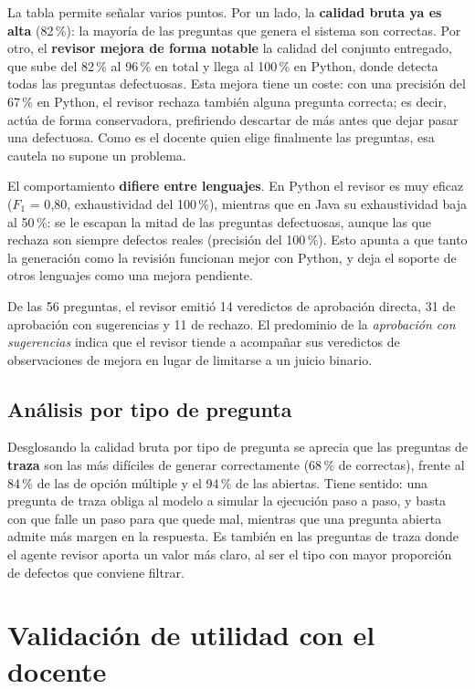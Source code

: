 La tabla permite señalar varios puntos. Por un lado, la \textbf{calidad bruta
ya es alta} (82\,\%): la mayoría de las preguntas que genera el sistema son
correctas. Por otro, el \textbf{revisor mejora de forma notable} la calidad del
conjunto entregado, que sube del 82\,\% al 96\,\% en total y llega al 100\,\%
en Python, donde detecta todas las preguntas defectuosas. Esta mejora tiene un
coste: con una precisión del 67\,\% en Python, el revisor rechaza también
alguna pregunta correcta; es decir, actúa de forma conservadora, prefiriendo
descartar de más antes que dejar pasar una defectuosa. Como es el docente quien
elige finalmente las preguntas, esa cautela no supone un problema.

El comportamiento \textbf{difiere entre lenguajes}. En Python el revisor es muy
eficaz ($F_1$ = 0{,}80, exhaustividad del 100\,\%), mientras que en
Java su exhaustividad baja al 50\,\%: se le escapan la mitad de las preguntas
defectuosas, aunque las que rechaza son siempre defectos reales (precisión del
100\,\%). Esto apunta a que tanto la generación como la revisión funcionan mejor con
Python, y deja el soporte de otros lenguajes como una mejora pendiente.

De las 56 preguntas, el revisor emitió 14 veredictos de aprobación directa, 31
de aprobación con sugerencias y 11 de rechazo. El predominio de la
\emph{aprobación con sugerencias} indica que el revisor tiende a acompañar sus
veredictos de observaciones de mejora en lugar de limitarse a un juicio binario.

\subsection{Análisis por tipo de pregunta}
\label{sec:res-tipos}

Desglosando la calidad bruta por tipo de pregunta se aprecia que las preguntas
de \textbf{traza} son las más difíciles de generar correctamente (68\,\% de
correctas), frente al 84\,\% de las de opción múltiple y el 94\,\% de las
abiertas. Tiene sentido: una pregunta de traza obliga al modelo a simular la ejecución
paso a paso, y basta con que falle un paso para que quede mal, mientras que una
pregunta abierta admite más margen en la respuesta. Es también en las
preguntas de traza donde el agente revisor aporta un valor más claro, al ser el
tipo con mayor proporción de defectos que conviene filtrar.


\section{Validación de utilidad con el docente}
\label{sec:res-utilidad}

